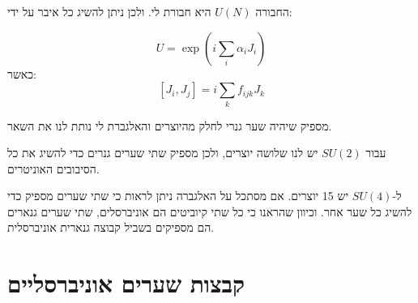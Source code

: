 \documentclass{tstextbook}
\begin{document}
\begin{reminder}
החבורה \(U(N)\) היא חבורת לי. ולכן ניתן להשיג כל איבר על ידי:

$$U=\exp\left(i{\sum_{i}}\alpha_{i}J_{i}\right)$$
כאשר:
$$[J_{i},J_{j}]=i\sum_{k}f_{i j k}J_{k}$$

\end{reminder}
\begin{corollary}
מספיק שיהיה שער גנרי לחלק מהיוצרים והאלגברת לי נותת לנו את השאר.

\end{corollary}
\begin{corollary}
עבור \(SU(2)\) יש לנו שלושה יוצרים, ולכן מספיק שתי שערים גנרים כדי להשיג את כל הסיבובים האוניטרים.

\end{corollary}
\begin{corollary}
ל-\(SU(4)\) יש 15 יוצרים. אם מסתכל על האלגברה ניתן לראות כי שתי שערים מספיק כדי להשיג כל שער אחר. וכיוון שהראנו כי כל שתי קיוביטים הם אוניברסלים, שתי שערים גנארים הם מספיקים בשביל קבוצה גנארית אוניברסלית.

\end{corollary}
\section{קבצות שערים אוניברסליים}
\end{document}
